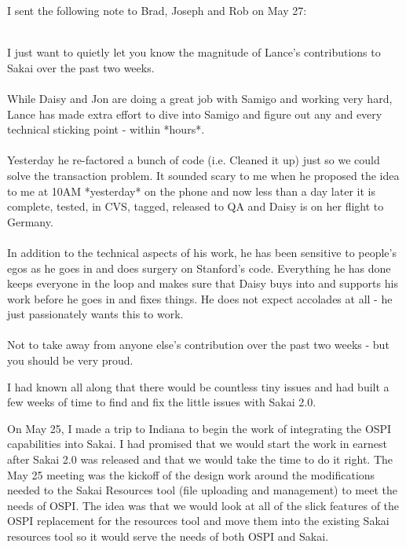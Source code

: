 \documentclass[12pt]{book}
\begin{document}
I sent the following note to Brad, Joseph and Rob on
May 27:\\
\\
\begin{sf}
I just want to quietly let you know the magnitude
of Lance's contributions to Sakai over the past two weeks.\\
\\
While Daisy and Jon are doing a great job with Samigo
and working very hard, Lance has made extra effort
to dive into Samigo and figure out any
and every technical sticking point - within *hours*.\\
\\
Yesterday he re-factored a bunch of code (i.e.  Cleaned it
up) just so we could solve the transaction problem.  It
sounded scary to me when he proposed the idea to me at
10AM *yesterday* on the phone and now less than a day
later it is complete, tested, in CVS, tagged, released to
QA and Daisy is on her flight to Germany.\\
\\
In addition to the technical aspects of his work, he has
been sensitive to people's egos as he goes in and does
surgery on Stanford's code.  Everything he has done keeps
everyone in the loop and makes sure that Daisy buys into
and supports his work before he goes in and fixes things.
He does not expect accolades at all - he just passionately
wants this to work.\\
\\
Not to take away from anyone else's contribution over the
past two weeks - but you should be very proud.\\
\end{sf}

I had known all along that there would be countless tiny
issues and had built a few weeks of time to find and
fix the little issues with Sakai 2.0.

On May 25, I made a trip to Indiana to begin the work
of integrating the OSPI capabilities into Sakai.  I had
promised that we would start the work in earnest after
Sakai 2.0 was released and that we would take the
time to do it right.   The May 25 meeting was the kickoff
of the design work around the modifications needed to the
Sakai Resources tool (file uploading and management) to
meet the needs of OSPI.  The idea was that we would look
at all of the slick features of the OSPI replacement for the
resources tool and move them into the existing Sakai
resources tool so it would serve the needs of both OSPI
and Sakai.
\end{document}
